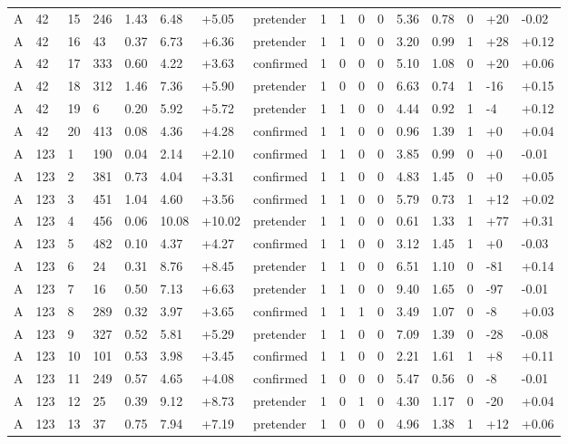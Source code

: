 \documentclass[11pt,a4paper]{article}
\begin{document}
{\begin{longtable}[]{@{}lllllllllllllllll@{}}
A & 42 & 15 & 246 & 1.43 & 6.48 & +5.05 & pretender & 1 & 1 & 0 & 0 & 5.36 & 0.78 & 0 & +20 & -0.02 \\
A & 42 & 16 & 43 & 0.37 & 6.73 & +6.36 & pretender & 1 & 1 & 0 & 0 & 3.20 & 0.99 & 1 & +28 & +0.12 \\
A & 42 & 17 & 333 & 0.60 & 4.22 & +3.63 & confirmed & 1 & 0 & 0 & 0 & 5.10 & 1.08 & 0 & +20 & +0.06 \\
A & 42 & 18 & 312 & 1.46 & 7.36 & +5.90 & pretender & 1 & 0 & 0 & 0 & 6.63 & 0.74 & 1 & -16 & +0.15 \\
A & 42 & 19 & 6 & 0.20 & 5.92 & +5.72 & pretender & 1 & 1 & 0 & 0 & 4.44 & 0.92 & 1 & -4 & +0.12 \\
A & 42 & 20 & 413 & 0.08 & 4.36 & +4.28 & confirmed & 1 & 1 & 0 & 0 & 0.96 & 1.39 & 1 & +0 & +0.04 \\
A & 123 & 1 & 190 & 0.04 & 2.14 & +2.10 & confirmed & 1 & 1 & 0 & 0 & 3.85 & 0.99 & 0 & +0 & -0.01 \\
A & 123 & 2 & 381 & 0.73 & 4.04 & +3.31 & confirmed & 1 & 1 & 0 & 0 & 4.83 & 1.45 & 0 & +0 & +0.05 \\
A & 123 & 3 & 451 & 1.04 & 4.60 & +3.56 & confirmed & 1 & 1 & 0 & 0 & 5.79 & 0.73 & 1 & +12 & +0.02 \\
A & 123 & 4 & 456 & 0.06 & 10.08 & +10.02 & pretender & 1 & 1 & 0 & 0 & 0.61 & 1.33 & 1 & +77 & +0.31 \\
A & 123 & 5 & 482 & 0.10 & 4.37 & +4.27 & confirmed & 1 & 1 & 0 & 0 & 3.12 & 1.45 & 1 & +0 & -0.03 \\
A & 123 & 6 & 24 & 0.31 & 8.76 & +8.45 & pretender & 1 & 1 & 0 & 0 & 6.51 & 1.10 & 0 & -81 & +0.14 \\
A & 123 & 7 & 16 & 0.50 & 7.13 & +6.63 & pretender & 1 & 1 & 0 & 0 & 9.40 & 1.65 & 0 & -97 & -0.01 \\
A & 123 & 8 & 289 & 0.32 & 3.97 & +3.65 & confirmed & 1 & 1 & 1 & 0 & 3.49 & 1.07 & 0 & -8 & +0.03 \\
A & 123 & 9 & 327 & 0.52 & 5.81 & +5.29 & pretender & 1 & 1 & 0 & 0 & 7.09 & 1.39 & 0 & -28 & -0.08 \\
A & 123 & 10 & 101 & 0.53 & 3.98 & +3.45 & confirmed & 1 & 1 & 0 & 0 & 2.21 & 1.61 & 1 & +8 & +0.11 \\
A & 123 & 11 & 249 & 0.57 & 4.65 & +4.08 & confirmed & 1 & 0 & 0 & 0 & 5.47 & 0.56 & 0 & -8 & -0.01 \\
A & 123 & 12 & 25 & 0.39 & 9.12 & +8.73 & pretender & 1 & 0 & 1 & 0 & 4.30 & 1.17 & 0 & -20 & +0.04 \\
A & 123 & 13 & 37 & 0.75 & 7.94 & +7.19 & pretender & 1 & 0 & 0 & 0 & 4.96 & 1.38 & 1 & +12 & +0.06 \\

\end{longtable}}
\end{document}
